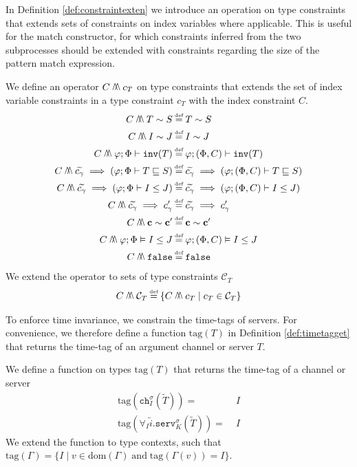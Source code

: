 In Definition \ref{def:constraintexten} we introduce an operation on type constraints that extends sets of constraints on index variables where applicable. This is useful for the match constructor, for which constraints inferred from the two subprocesses should be extended with constraints regarding the size of the pattern match expression.
%
\begin{defi}\label{def:constraintexten}
We define an operator $C\merge c_T$ on type constraints that extends the set of index variable constraints in a type constraint $c_T$ with the index constraint $C$.
\begin{align*}
    C \merge T \sim S \defeq&\; T \sim S\\
    C \merge I \sim J \defeq&\; I \sim J \\
    C \merge \varphi;\Phi\vdash \texttt{inv}(T) \defeq&\; \varphi;(\Phi,C)\vdash \texttt{inv}(T)\\
    C \merge \widetilde{c_\gamma} \implies (\varphi;\Phi\vdash T \sqsubseteq S) \defeq&\; \widetilde{c_\gamma} \implies (\varphi;(\Phi,C)\vdash T \sqsubseteq S)\\
    C \merge \widetilde{c_\gamma} \implies (\varphi;\Phi\vdash I \leq J) \defeq&\; \widetilde{c_\gamma}\implies (\varphi;(\Phi,C)\vdash I \leq J)\\
    C \merge \widetilde{c_\gamma} \implies c_\gamma' \defeq&\; \widetilde{c_\gamma} \implies c_\gamma' \\
    C \merge \mathbf{c} \sim \mathbf{c}' \defeq&\; \mathbf{c} \sim \mathbf{c}'\\
    C\merge \varphi;\Phi\vDash I \leq J \defeq&\; \varphi;(\Phi,C)\vDash I\leq J \\
    C\merge \texttt{false} \defeq&\; \texttt{false}
\end{align*}
We extend the operator to sets of type constraints $\mathcal{C}_T$
\begin{align*}
    C \merge \mathcal{C}_T \defeq \{ C \merge c_T \mid c_T \in \mathcal{C}_T \}
\end{align*}
\end{defi}
%
To enforce time invariance, we constrain the time-tags of servers. For convenience, we therefore define a function $\text{tag}(T)$ in Definition \ref{def:timetagget} that returns the time-tag of an argument channel or server $T$.
\begin{defi}\label{def:timetagget}
We define a function on types $\text{tag}(T)$ that returns the time-tag of a channel or server
\begin{align*}
    \text{tag}(\texttt{ch}^\sigma_I(\widetilde{T})) =&\; I\\
    \text{tag}(\forall_I\widetilde{i}.\texttt{serv}^\sigma_K(\widetilde{T})) =&\; I
\end{align*}
We extend the function to type contexts, such that $\text{tag}(\Gamma) = \{ I \mid v \in \text{dom}(\Gamma)\; \text{and}\; \text{tag}(\Gamma(v)) = I \}$.
\end{defi}
